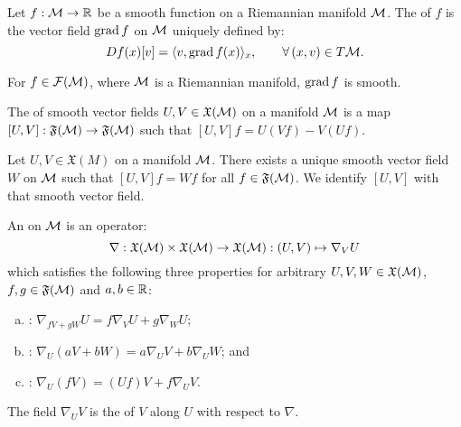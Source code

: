 \documentclass[11pt,a4paper]{article}
\begin{document}
\begin{definition}
Let $f:\mathcal{M}\rightarrow \mathbb{R}$ be a smooth function on a Riemannian manifold $\mathcal{M}$. The  of $f$ is the vector field $\text{grad}\, f$ on $\mathcal{M}$ uniquely defined by:
\begin{equation*}
    Df(x)[v] = \langle v, \text{grad}\, f(x) \rangle_x, \qquad \forall\,(x,v)\in T\mathcal{M}.
\end{equation*}
\end{definition}

\begin{proposition}
For $f\in \mathcal{F}(\mathcal{M})$, where $\mathcal{M}$ is a Riemannian manifold, $\text{grad}\, f$ is smooth.
\end{proposition}

\begin{definition}
The  of smooth vector fields $U,V\in \mathfrak{X}(\mathcal{M})$ on a manifold $\mathcal{M}$ is a map $[U,V]:\mathfrak{F}(\mathcal{M})\rightarrow \mathfrak{F}(\mathcal{M})$ such that $[U,V]f = U(Vf) - V(Uf)$.
\end{definition}

\begin{proposition}
Let $U,V\in \mathfrak{X}(M)$ on a manifold $\mathcal{M}$. There exists a unique smooth vector field $W$ on $\mathcal{M}$ such that $[U,V]f = Wf$ for all $f\in \mathfrak{F}(\mathcal{M})$. We identify $[U,V]$ with that smooth vector field.
\end{proposition}

\begin{definition}
An  on $\mathcal{M}$ is an operator:
\begin{equation*}
\nabla:\mathfrak{X}(\mathcal{M})\times \mathfrak{X}(\mathcal{M})\rightarrow \mathfrak{X}(\mathcal{M}): (U,V)\mapsto \nabla_V U
\end{equation*}
which satisfies the following three properties for arbitrary $U,V,W\in \mathfrak{X}(\mathcal{M})$, $f,g\in\mathfrak{F}(\mathcal{M})$ and $a,b\in \mathbb{R}$:
\begin{enumerate}[(a)]
    \item {}: $\nabla_{fV+gW}U = f\nabla_V U + g\nabla_W U$;
    \item {}: $\nabla_U(aV+bW) = a\nabla_U V+b\nabla_U W$; and
    \item {}: $\nabla_U (fV) = (Uf)V + f\nabla_U V$.
\end{enumerate}
The field $\nabla_U V$ is the  of $V$ along $U$ with respect to $\nabla$. 
\end{definition}
\end{document}

